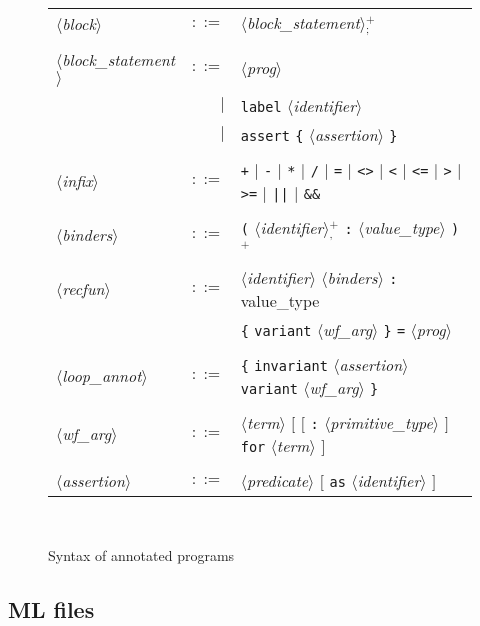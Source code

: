 \documentclass[a4paper,12pt]{report}
\newcommand{\te}[1]{\texttt{#1}}
\newcommand{\nt}[1]{$\langle$\textsl{#1}$\rangle$}
\newcommand{\plus}{$^+$}
\newcommand{\plussep}[1]{$^+_#1$}
\begin{document}
\begin{figure}[htbp]
\begin{center}
\begin{tabular}{lrl}
  \nt{block}
    & $::=$ & \nt{block\_statement}\plussep{\te{;}} \\
  \\[0.1em]

      \nt{block\_statement}
    & $::=$ & \nt{prog} \\
      & $|$ & \te{label} \nt{identifier} \\
      & $|$ & \te{assert} \te{\{} \nt{assertion} \te{\}} \\
  \\[0.1em]
 
  \nt{infix}
    & $::=$ & \te{+} $|$ \te{-} $|$ \te{*} $|$ \te{/} $|$ 
              \te{=} $|$ \te{<>} $|$ 
              \te{<} $|$ \te{<=} $|$ \te{>} $|$ \te{>=} $|$
              \te{||} $|$ \te{\&\&} \\
  \\[0.1em]

  \nt{binders}
    & $::=$ & \te{(} \nt{identifier}\plussep{\te{,}} \te{:}
              \nt{value\_type} \te{)}\plus \\
  \\[0.1em]

  \nt{recfun}
    & $::=$ & \nt{identifier} \nt{binders} \te{:}
              value\_type \\
      &     & \te{\{} \te{variant} \nt{wf\_arg} \te{\}}
              \te{=} \nt{prog} \\
  \\[0.1em]

  \nt{loop\_annot}
    & $::=$ & \te{\{} \te{invariant} \nt{assertion} 
              \te{variant} \nt{wf\_arg} \te{\}} \\
  \\[0.1em]

  \nt{wf\_arg} 
    & $::=$ & \nt{term} $[$ $[$ \te{:} \nt{primitive\_type} $]$
                            \te{for} \nt{term} $]$ \\
  \\[0.1em]

  \nt{assertion} 
    & $::=$ & \nt{predicate} $[$ \te{as} \nt{identifier} $]$ \\

\end{tabular}\\
\hrulefill
\caption{Syntax of annotated programs}
\label{fig:caml}
\end{center}
\end{figure}


\subsection{ML files}
\label{syntax:mlfiles}
\end{document}
